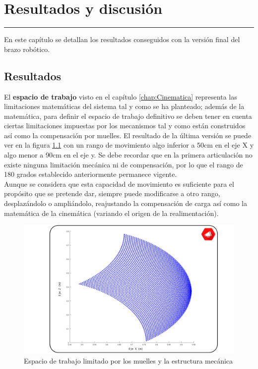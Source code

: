 \chapter{Resultados y discusión} \label{chap:Resultados}
\hrule
\vspace{3mm}

En este capítulo se detallan los resultados conseguidos con la versión final del brazo robótico.


\section{Resultados}
	
	El \textbf{espacio de trabajo} visto en el capítulo \ref{chap:Cinematica} representa las limitaciones matemáticas del sistema tal y como se ha planteado; además de la matemática, para definir el espacio de trabajo definitivo se deben tener en cuenta ciertas limitaciones impuestas por los mecanismos tal y como están construidos así como la compensación por muelles. El resultado de la última versión se puede ver en la figura \ref{fig:Resultados:workspace} con un rango de movimiento algo inferior a 50cm en el eje X y algo menor a 90cm en el eje y. Se debe recordar que en la primera articulación no existe ninguna limitación mecánica ni de compensación, por lo que el rango de 180 grados establecido anteriormente permanece vigente.
	\\
	
	Aunque se considera que esta capacidad de movimiento es suficiente para el propósito que se pretende dar, siempre puede modificarse a otro rango, desplazándolo o ampliándolo, reajustando la compensación de carga así como la matemática de la cinemática (variando el origen de la realimentación).
	
	\begin{figure}[t]
		\centering
		\includegraphics[width=1\textwidth]{figuras/Imagenes_Resultados/workspace_robot_real.jpg}
		\caption{Espacio de trabajo limitado por los muelles y la estructura mecánica}
		\label{fig:Resultados:workspace}
	\end{figure}
	
